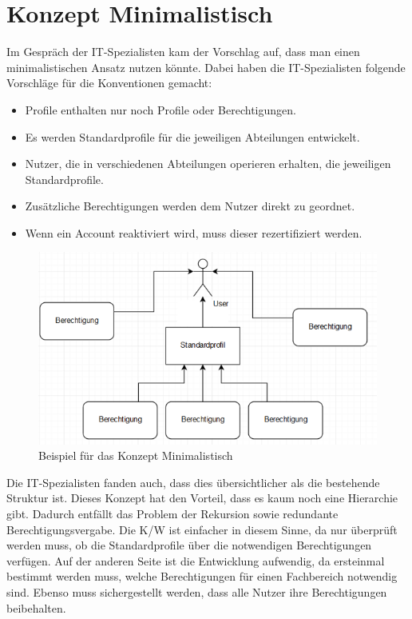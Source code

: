 \newpage
\section{Konzept Minimalistisch}
\label{sec:chapter04:minimal}
Im Gespräch der IT-Spezialisten kam der Vorschlag auf, dass man einen minimalistischen Ansatz nutzen könnte.
Dabei haben die IT-Spezialisten folgende Vorschläge für die Konventionen gemacht:
\newline
\begin{itemize}
	\item Profile enthalten nur noch Profile oder Berechtigungen.
	\item Es werden Standardprofile für die jeweiligen Abteilungen entwickelt.
	\item Nutzer, die in verschiedenen Abteilungen operieren erhalten, die jeweiligen Standardprofile.
	\item Zusätzliche Berechtigungen werden dem Nutzer direkt zu geordnet.
	\item Wenn ein Account reaktiviert wird, muss dieser rezertifiziert werden.
\end{itemize}
\begin{figure}[h!]
 \centering
 \includegraphics[width=1\textwidth]{gfx/Picture/Minimal.PNG}
 \caption{Beispiel für das Konzept Minimalistisch}
 \label{fig:Min}
\end{figure}
Die IT-Spezialisten fanden auch, dass dies übersichtlicher als die bestehende Struktur ist.
Dieses Konzept hat den Vorteil, dass es kaum noch eine Hierarchie gibt.
Dadurch entfällt das Problem der Rekursion sowie redundante Berechtigungsvergabe.
Die \ac{K/W} ist einfacher in diesem Sinne, da nur überprüft werden muss, ob die Standardprofile über die notwendigen Berechtigungen verfügen.
Auf der anderen Seite ist die Entwicklung aufwendig, da ersteinmal bestimmt werden muss, welche Berechtigungen für einen Fachbereich notwendig sind. Ebenso muss sichergestellt werden, dass alle Nutzer ihre Berechtigungen beibehalten.
